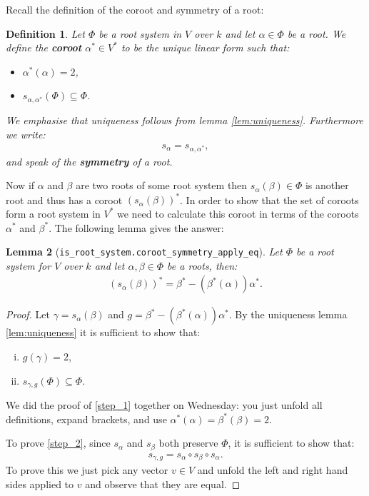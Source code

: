 \documentclass[12pt, a4paper]{article}
\newtheorem{lemma}{Lemma}[section]
\newtheorem{definition}[lemma]{Definition}
\begin{document}
Recall the definition of the coroot and symmetry of a root:
\begin{definition}
  Let $\Phi$ be a root system in $V$ over $k$ and let $\alpha \in \Phi$ be a root. We define the
  \textbf{coroot} $\alpha^* \in V^*$ to be the unique linear form such that:
  \begin{itemize}
    \item $\alpha^*(\alpha) = 2$,
    \item $s_{\alpha, \alpha^*}(\Phi) \subseteq \Phi$.
  \end{itemize}
  We emphasise that uniqueness follows from lemma \ref{lem:uniqueness}. Furthermore we write:
  \begin{align*}
    s_\alpha = s_{\alpha, \alpha^*},
  \end{align*}
  and speak of the \textbf{symmetry} of a root.
\end{definition}

Now if $\alpha$ and $\beta$ are two roots of some root system then $s_\alpha(\beta) \in \Phi$
is another root and thus has a coroot $(s_\alpha(\beta))^*$. In order to show that the set of
coroots form a root system in $V^*$ we need to calculate this coroot in terms of the coroots
$\alpha^*$ and $\beta^*$. The following lemma gives the answer:
\begin{lemma}[\texttt{is\_root\_system.coroot\_symmetry\_apply\_eq}]
  Let $\Phi$ be a root system for $V$ over $k$ and let $\alpha, \beta \in \Phi$ be a roots, then:
  \begin{align*}
    (s_\alpha(\beta))^* = \beta^* - (\beta^*(\alpha))\alpha^*.
  \end{align*}
\end{lemma}
\begin{proof}
  Let $\gamma = s_\alpha(\beta)$ and $g = \beta^* - (\beta^*(\alpha))\alpha^*$.
  By the uniqueness lemma \ref{lem:uniqueness} it is sufficient to show that:
  \begin{enumerate}[(i)]
    \item $g(\gamma) = 2$\label{step_1},
    \item $s_{\gamma, g}(\Phi) \subseteq \Phi$\label{step_2}.
  \end{enumerate}
  We did the proof of \eqref{step_1} together on Wednesday: you just unfold all definitions,
  expand brackets, and use $\alpha^*(\alpha) = \beta^*(\beta) = 2$.

  To prove \eqref{step_2}, since $s_\alpha$ and $s_\beta$ both preserve $\Phi$, it is sufficient to
  show that:
  \begin{align*}
    s_{\gamma, g} = s_\alpha \circ s_\beta \circ s_\alpha .
  \end{align*}
  To prove this we just pick any vector $v \in V$ and unfold the left and right hand sides applied
  to $v$ and observe that they are equal.
\end{proof}
\end{document}
